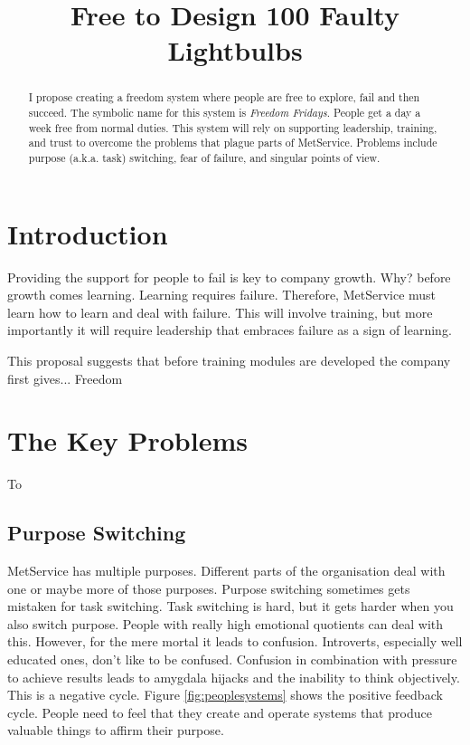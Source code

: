 \documentclass[conference]{IEEEtran}
\begin{document}
\title{Free to Design 100 Faulty Lightbulbs}

\author{
}

\maketitle

\begin{abstract}
I propose creating a freedom system where people are free to explore, fail and then succeed. The symbolic name for this system is \emph{Freedom Fridays}. People get a day a week free from normal duties. This system will rely on supporting leadership, training, and trust to overcome the problems that plague parts of MetService. Problems include purpose (a.k.a. task) switching, fear of failure, and singular points of view.   
\end{abstract}

\section{Introduction}
Providing the support for people to fail is key to company growth. Why? before growth comes learning. Learning requires failure. Therefore, MetService must learn how to learn and deal with failure. This will involve training, but more importantly it will require leadership that embraces failure as a sign of learning.  

This proposal suggests that before training modules are developed the company first gives... Freedom 

\section{The Key Problems}
To 

\subsection{Purpose Switching}
MetService has multiple purposes. Different parts of the organisation deal with one or maybe more of those purposes. Purpose switching sometimes gets mistaken for task switching. Task switching is hard, but it gets harder when you also switch purpose. People with really high emotional quotients can deal with this. However, for the mere mortal it leads to confusion. Introverts, especially well educated ones, don't like to be confused. Confusion in combination with pressure to achieve results leads to amygdala hijacks and the inability to think objectively. This is a negative cycle. Figure \ref{fig:peoplesystems} shows the positive feedback cycle. People need to feel that they create and operate systems that produce valuable things to affirm their purpose.
\end{document}

